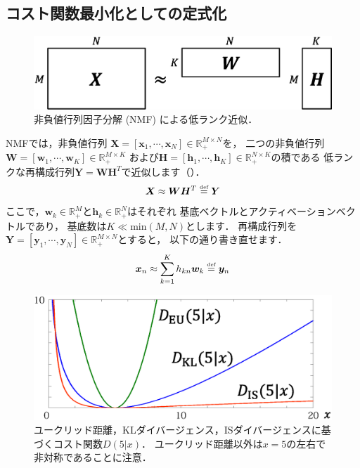 \subsection{コスト関数最小化としての定式化}
\label{sec:nmf_min_cost}

\begin{figure}[t]
\centering
\includegraphics[width=.93\linewidth]{sections/factorization/nmf}
\caption{非負値行列因子分解 (NMF) による低ランク近似．}
\label{fig:nmf}
\end{figure}

NMFでは，非負値行列
$\bm{X} = [\bm{x}_1,\cdots,\bm{x}_N] \in \mathbb{R}_+^{M \times N}$を，
二つの非負値行列$\bm{W} = [\bm{w}_1,\cdots,\bm{w}_K] \in \mathbb{R}_+^{M \times K}$
および$\bm{H} = [\bm{h}_1,\cdots,\bm{h}_K] \in \mathbb{R}_+^{N \times K}$の積である
低ランクな再構成行列$\bm{Y}=\bm{W}\bm{H}^T$で近似します（）．
\begin{align}
\bm{X} \approx \bm{W}\bm{H}^T \overset{\mbox{\tiny def}}{=} \bm{Y}
\end{align}
ここで，$\bm{w}_k \in \mathbb{R}_+^M$と$\bm{h}_k \in \mathbb{R}_+^N$はそれぞれ
基底ベクトルとアクティベーションベクトルであり，
基底数は$K \ll \mbox{min}(M, N)$とします．
再構成行列を$\bm{Y} = [\bm{y}_1,\cdots,\bm{y}_N] \in \mathbb{R}_+^{M \times N}$とすると，
以下の通り書き直せます．
\begin{align}
 \bm{x}_n \approx \sum_{k=1}^{K} h_{kn} \bm{w}_k \overset{\mbox{\tiny def}}{=} \bm{y}_n
 \label{eqn:x_wh_elem}
\end{align}

\begin{figure}[t]
\centering
\includegraphics[width=.9\linewidth]{sections/factorization/cost_functions}
\vspace{-2mm}
\caption{ユークリッド距離，KLダイバージェンス，ISダイバージェンスに基づくコスト関数$D(5|x)$．
ユークリッド距離以外は$x=5$の左右で非対称であることに注意．}
\label{fig:cost_functions}
\end{figure}

